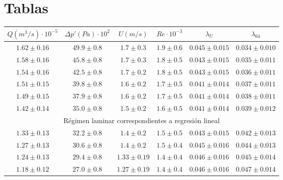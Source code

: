 \section{Tablas}

\begin{table*}[h]
	\centering
		\begin{tabular}{cccccc}
			\toprule
$Q (m^3/s) \cdot 10^{-5}$   &   $\Delta p' (Pa) \cdot 10^2$   &   $U (m/s)$   &   $Re \cdot 10^{-3}$   &   $\lambda_U$   &   $\lambda_{64}$ \\
			\midrule
$1.62 \pm 0.16$   &   $49.9 \pm 0.8$   &   $1.7 \pm 0.3$   &   $1.9 \pm 0.6$   &   $0.045 \pm 0.015$   &   $0.034 \pm 0.010$  \\
$1.58 \pm 0.16$   &   $45.8 \pm 0.8$   &   $1.7 \pm 0.3$   &   $1.8 \pm 0.5$   &   $0.043 \pm 0.015$   &   $0.035 \pm 0.011$  \\
$1.54 \pm 0.16$   &   $42.5 \pm 0.8$   &   $1.7 \pm 0.2$   &   $1.8 \pm 0.5$   &   $0.043 \pm 0.015$   &   $0.036 \pm 0.011$  \\
$1.51 \pm 0.15$   &   $39.8 \pm 0.8$   &   $1.6 \pm 0.2$   &   $1.7 \pm 0.5$   &   $0.041 \pm 0.014$   &   $0.037 \pm 0.011$  \\
$1.49 \pm 0.15$   &   $37.9 \pm 0.8$   &   $1.6 \pm 0.2$   &   $1.7 \pm 0.5$   &   $0.041 \pm 0.014$   &   $0.038 \pm 0.011$  \\
$1.42 \pm 0.14$   &   $35.0 \pm 0.8$   &   $1.5 \pm 0.2$   &   $1.6 \pm 0.5$   &   $0.041 \pm 0.014$   &   $0.039 \pm 0.012$  \\
			\cmidrule(r){1-6}
			\multicolumn{6}{c}{Régimen laminar correspondientes a regresión lineal} \\
			\cmidrule(r){1-6}
$1.33 \pm 0.13$   &   $32.2 \pm 0.8$   &   $1.4 \pm 0.2$   &   $1.5 \pm 0.5$   &   $0.043 \pm 0.015$   &   $0.042 \pm 0.013$  \\
$1.27 \pm 0.13$   &   $30.6 \pm 0.8$   &   $1.4 \pm 0.2$   &   $1.5 \pm 0.4$   &   $0.045 \pm 0.016$   &   $0.044 \pm 0.013$  \\
$1.24 \pm 0.13$   &   $29.4 \pm 0.8$   &   $1.33 \pm 0.19$   &   $1.4 \pm 0.4$   &   $0.046 \pm 0.016$   &   $0.045 \pm 0.014$  \\
$1.18 \pm 0.12$   &   $27.0 \pm 0.8$   &   $1.27 \pm 0.19$   &   $1.4 \pm 0.4$   &   $0.046 \pm 0.016$   &   $0.047 \pm 0.014$  \\

\end{tabular}
\end{table*}
